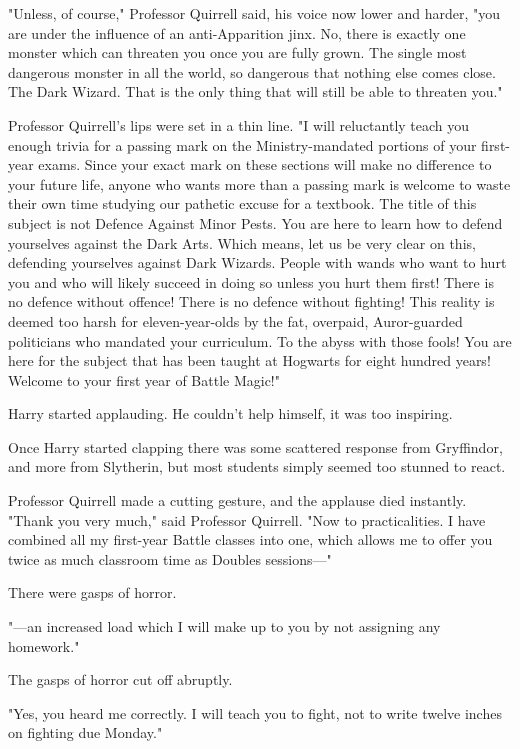 "Unless, of course," Professor Quirrell said, his voice now lower and harder,
"you are under the influence of an anti-Apparition jinx. No, there is exactly
one monster which can threaten you once you are fully grown. The single most
dangerous monster in all the world, so dangerous that nothing else comes close.
The Dark Wizard. That is the only thing that will still be able to threaten
you."

Professor Quirrell’s lips were set in a thin line. "I will reluctantly teach
you enough trivia for a passing mark on the Ministry-mandated portions of your
first-year exams. Since your exact mark on these sections will make no
difference to your future life, anyone who wants more than a passing mark is
welcome to waste their own time studying our pathetic excuse for a textbook.
The title of this subject is not Defence Against Minor Pests. You are here to
learn how to defend yourselves against the Dark Arts. Which means, let us be
very clear on this, defending yourselves against Dark Wizards. People with
wands who want to hurt you and who will likely succeed in doing so unless you
hurt them first! There is no defence without offence! There is no defence
without fighting! This reality is deemed too harsh for eleven-year-olds by the
fat, overpaid, Auror-guarded politicians who mandated your curriculum. To the
abyss with those fools! You are here for the subject that has been taught at
Hogwarts for eight hundred years! Welcome to your first year of Battle Magic!"

Harry started applauding. He couldn’t help himself, it was too inspiring.

Once Harry started clapping there was some scattered response from Gryffindor,
and more from Slytherin, but most students simply seemed too stunned to react.

Professor Quirrell made a cutting gesture, and the applause died instantly.
"Thank you very much," said Professor Quirrell. "Now to practicalities. I have
combined all my first-year Battle classes into one, which allows me to offer
you twice as much classroom time as Doubles sessions—"

There were gasps of horror.

"—an increased load which I will make up to you by not assigning any
homework."

The gasps of horror cut off abruptly.

"Yes, you heard me correctly. I will teach you to fight, not to write twelve
inches on fighting due Monday."

